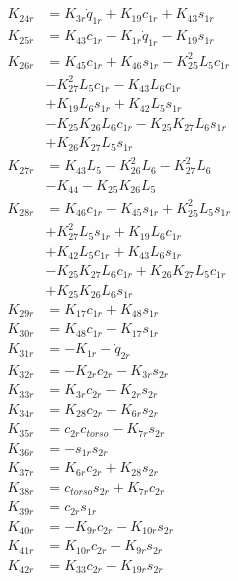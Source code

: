 \begin{multicols}{2}
\begin{align}
K_{24r} &= K_{3r}\dot{q}_{1r} + K_{19}c_{1r} + K_{43}s_{1r} \nonumber \\
K_{25r} &= K_{43}c_{1r} - K_{1r}\dot{q}_{1r} - K_{19}s_{1r} \nonumber \\
K_{26r} &= K_{45}c_{1r} + K_{46}s_{1r} - K_{25}^2L_5c_{1r}  \nonumber \\
&- K_{27}^2L_5c_{1r} - K_{43}L_6c_{1r}  \nonumber \\
&+ K_{19}L_6s_{1r} + K_{42}L_5s_{1r}  \nonumber \\
&- K_{25}K_{26}L_6c_{1r} - K_{25}K_{27}L_6s_{1r}  \nonumber \\
&+ K_{26}K_{27}L_5s_{1r} \nonumber \\
K_{27r} &= K_{43}L_5 - K_{26}^2L_6 - K_{27}^2L_6  \nonumber \\
&- K_{44} - K_{25}K_{26}L_5 \nonumber \\
K_{28r} &= K_{46}c_{1r} - K_{45}s_{1r} + K_{25}^2L_5s_{1r}  \nonumber \\
&+ K_{27}^2L_5s_{1r} + K_{19}L_6c_{1r}  \nonumber \\
&+ K_{42}L_5c_{1r} + K_{43}L_6s_{1r}  \nonumber \\
&- K_{25}K_{27}L_6c_{1r} + K_{26}K_{27}L_5c_{1r}  \nonumber \\
&+ K_{25}K_{26}L_6s_{1r} \nonumber \\
K_{29r} &= K_{17}c_{1r} + K_{48}s_{1r} \nonumber \\
K_{30r} &= K_{48}c_{1r} - K_{17}s_{1r} \nonumber \\
K_{31r} &= - K_{1r} - \dot{q}_{2r} \nonumber \\
K_{32r} &= - K_{2r}c_{2r} - K_{3r}s_{2r} \nonumber \\
K_{33r} &= K_{3r}c_{2r} - K_{2r}s_{2r} \nonumber \\
K_{34r} &= K_{28}c_{2r} - K_{6r}s_{2r} \nonumber \\
K_{35r} &= c_{2r}c_{torso} - K_{7r}s_{2r} \nonumber \\
K_{36r} &= -s_{1r}s_{2r} \nonumber \\
K_{37r} &= K_{6r}c_{2r} + K_{28}s_{2r} \nonumber \\
K_{38r} &= c_{torso}s_{2r} + K_{7r}c_{2r} \nonumber \\
K_{39r} &= c_{2r}s_{1r} \nonumber \\
K_{40r} &= - K_{9r}c_{2r} - K_{10r}s_{2r} \nonumber \\
K_{41r} &= K_{10r}c_{2r} - K_{9r}s_{2r} \nonumber \\
K_{42r} &= K_{33}c_{2r} - K_{19r}s_{2r} \nonumber \\

\end{align}
\end{multicols}
